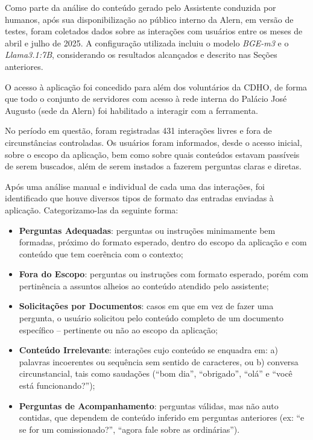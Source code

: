 Como parte da análise do conteúdo gerado pelo Assistente conduzida por humanos, após sua disponibilização ao público interno da Alern, em versão de testes, foram coletados dados sobre as interações com usuários entre os meses de abril e julho de 2025. A configuração utilizada incluiu o modelo \textit{BGE-m3} e o \textit{Llama3.1:7B}, considerando os resultados alcançados e descrito nas Seções anteriores.

O acesso à aplicação foi concedido para além dos voluntários da \ac{CDHO}, de forma que todo o conjunto de servidores com acesso à rede interna do Palácio José Augusto (sede da Alern) foi habilitado a interagir com a ferramenta. 

No período em questão, foram registradas 431 interações livres e fora de circunstâncias controladas. Os usuários foram informados, desde o acesso inicial, sobre o escopo da aplicação, bem como sobre quais conteúdos estavam passíveis de serem buscados, além de serem instados a fazerem perguntas claras e diretas.

Após uma análise manual e individual de cada uma das interações, foi identificado que houve diversos tipos de formato das entradas enviadas à aplicação. Categorizamo-las da seguinte forma:

\begin{itemize}
    \item \textbf{Perguntas Adequadas}: perguntas ou instruções minimamente bem formadas, próximo do formato esperado, dentro do escopo da aplicação e com conteúdo que tem coerência com o contexto; 
    \item \textbf{Fora do Escopo}: perguntas ou instruções com formato esperado, porém com pertinência a assuntos alheios ao conteúdo atendido pelo assistente;
    \item \textbf{Solicitações por Documentos}: casos em que em vez de fazer uma pergunta, o usuário solicitou pelo conteúdo completo de um documento específico -- pertinente ou não ao escopo da aplicação;
    \item \textbf{Conteúdo Irrelevante}: interações cujo conteúdo se enquadra em: a) palavras incoerentes ou sequência sem sentido de caracteres, ou b) conversa circunstancial, tais como saudações (``bom dia'', ``obrigado'', ``olá'' e ``você está funcionando?'');
    \item \textbf{Perguntas de Acompanhamento}: perguntas válidas, mas não auto contidas, que dependem de conteúdo inferido em perguntas anteriores (ex: ``e se for um comissionado?'', ``agora fale sobre as ordinárias'').
\end{itemize}

